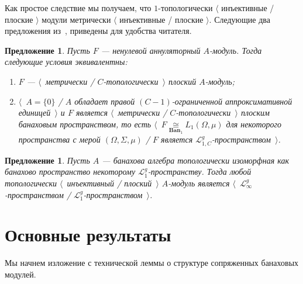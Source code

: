 \documentclass[12pt]{article}
\newtheorem{proposition}[theorem]{Предложение}
\newcommand{\isom}[1]{\mathop{\mathbin{\cong}}\limits_{#1}}
\begin{document}
Как простое следствие мы получаем, что $1$-топологически $\langle$ инъективные /
плоские $\rangle$ модули метрически $\langle$ инъективные / плоские $\rangle$.
Следующие два предложения из~\cite{NemGeomProjInjFlatBanMod}, приведены для
удобства читателя.
\begin{proposition}\label{MetTopFlatAnnihModCharac} Пусть $F$ --- ненулевой
аннуляторный $A$-модуль. Тогда следующие условия эквивалентны:
\begin{enumerate}[label = (\roman*)]
\item $F$ --- $\langle$~метрически / $C$-топологически~$\rangle$ плоский
$A$-модуль;
\item $\langle$~$A= \{0 \}$ / $A$ обладает правой $(C-1)$-ограниченной
аппроксимативной единицей~$\rangle$ и $F$ является $\langle$~метрически /
$C$-топологически~$\rangle$ плоским банаховым пространством, то есть
$\langle$~$F\isom{\mathbf{Ban}_1}L_1(\Omega,\mu)$ для некоторого пространства с
мерой $(\Omega, \Sigma, \mu)$ / $F$ является
$\mathcal{L}_{1,C}^g$-пространством~$\rangle$.
\end{enumerate}
\end{proposition}

\begin{proposition}\label{TopProjInjFlatModOverMthscrL1SpCharac} Пусть $A$ ---
банахова алгебра топологически изоморфная как банахово пространство некоторому
$\mathcal{L}_1^g$-пространству. Тогда любой топологически $\langle$~инъективный
/ плоский~$\rangle$ $A$-модуль является
$\langle$~$\mathcal{L}_\infty^g$-пространством /
$\mathcal{L}_1^g$-пространством~$\rangle$.
\end{proposition}


\section{Основные результаты}\label{SectionMainResults}

Мы начнем изложение с технической леммы о структуре сопряженных банаховых
модулей.
\end{document}
